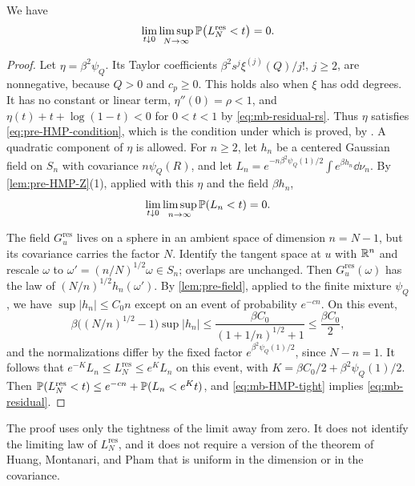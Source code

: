\begin{lemma}\label{lem:mb-residual}
We have
\begin{equation}\label{eq:mb-residual}
\lim_{t\downarrow0}\limsup_{N\to\infty}\mathbb P\bigl(L_N^{\mathrm{res}}<t\bigr)=0 .
\end{equation}
\end{lemma}

\begin{proof}
Let $\eta=\beta^2\psi_Q$. Its Taylor coefficients $\beta^2s^j\xi^{(j)}(Q)/j!$, $j\ge2$, are nonnegative, because $Q>0$ and $c_p\ge0$. This holds also when $\xi$ has odd degrees. It has no constant or linear term, $\eta''(0)=\rho<1$, and $\eta(t)+t+\log(1-t)<0$ for $0<t<1$ by \eqref{eq:mb-residual-rs}. Thus $\eta$ satisfies \eqref{eq:pre-HMP-condition}, which is the condition \cite[Eq.~(2.21)]{HuangMontanariPham2024} under which \cite[Lemma~3.2]{HuangMontanariPham2024} is proved, by \cite[Remark~3.3]{HuangMontanariPham2024}. A quadratic component of $\eta$ is allowed. For $n\ge2$, let $h_n$ be a centered Gaussian field on $S_n$ with covariance $n\psi_Q(R)$, and let $L_n=e^{-n\beta^2\psi_Q(1)/2}\int e^{\beta h_n}\dd\nu_n$. By \cref{lem:pre-HMP-Z}(1), applied with this $\eta$ and the field $\beta h_n$,
\begin{equation}\label{eq:mb-HMP-tight}
\lim_{t\downarrow0}\limsup_{n\to\infty}\mathbb P(L_n<t)=0 .
\end{equation}

The field $G^{\mathrm{res}}_u$ lives on a sphere in an ambient space of dimension $n=N-1$, but its covariance carries the factor $N$. Identify the tangent space at $u$ with $\mathbb R^n$ and rescale $\omega$ to $\omega'=(n/N)^{1/2}\omega\in S_n$; overlaps are unchanged. Then $G^{\mathrm{res}}_u(\omega)$ has the law of $(N/n)^{1/2}h_n(\omega')$. By \cref{lem:pre-field}, applied to the finite mixture $\psi_Q$, we have $\sup|h_n|\le C_0n$ except on an event of probability $e^{-cn}$. On this event,
\[
\beta\bigl((N/n)^{1/2}-1\bigr)\sup|h_n|\le\frac{\beta C_0}{(1+1/n)^{1/2}+1}\le\frac{\beta C_0}2,
\]
and the normalizations differ by the fixed factor $e^{\beta^2\psi_Q(1)/2}$, since $N-n=1$. It follows that $e^{-K}L_n\le L_N^{\mathrm{res}}\le e^KL_n$ on this event, with $K=\beta C_0/2+\beta^2\psi_Q(1)/2$. Then $\mathbb P(L_N^{\mathrm{res}}<t)\le e^{-cn}+\mathbb P(L_n<e^Kt)$, and \eqref{eq:mb-HMP-tight} implies \eqref{eq:mb-residual}.
\end{proof}

The proof uses only the tightness of the limit away from zero. It does not identify the limiting law of $L_N^{\mathrm{res}}$, and it does not require a version of the theorem of Huang, Montanari, and Pham that is uniform in the dimension or in the covariance.

